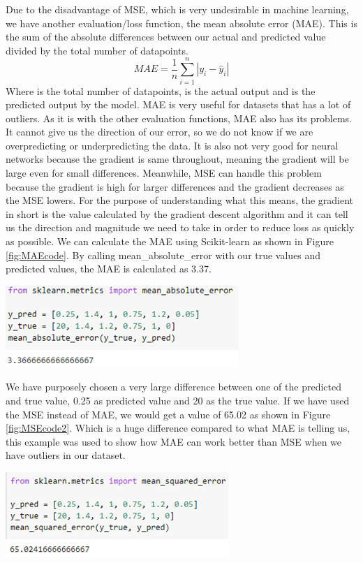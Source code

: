 \documentclass[a4paper,12pt]{report}
\begin{document}
Due to the disadvantage of MSE, which is very undesirable in machine learning, we have another evaluation/loss function, the mean absolute error (MAE). This is the sum of the absolute differences between our actual and predicted value divided by the total number of datapoints.
$$MAE=\frac{1}{n}\sum_{i=1}^n|y_i-\hat{y}_i|$$
Where  is the total number of datapoints,  is the actual output and  is the predicted output by the model. MAE is very useful for datasets that has a lot of outliers. As it is with the other evaluation functions, MAE also has its problems. It cannot give us the direction of our error, so we do not know if we are overpredicting or underpredicting the data. It is also not very good for neural networks because the gradient is same throughout, meaning the gradient will be large even for small differences. Meanwhile, MSE can handle this problem because the gradient is high for larger differences and the gradient decreases as the MSE lowers. For the purpose of understanding what this means, the gradient in short is the value calculated by the gradient descent algorithm and it can tell us the direction and magnitude we need to take in order to reduce loss as quickly as possible. We can calculate the MAE using Scikit-learn as shown in Figure \ref{fig:MAEcode}. By calling mean\_absolute\_error with our true values and predicted values, the MAE is calculated as 3.37.

\begin{center}
    \captionsetup{type=figure}
    \includegraphics[width=.6\linewidth]{media/MAEcode.png}
    \label{fig:MAEcode}
\end{center}

We have purposely chosen a very large difference between one of the predicted and true value, 0.25 as predicted value and 20 as the true value. If  we have used the MSE instead of MAE, we would get a value of 65.02 as shown in Figure \ref{fig:MSEcode2}. Which is a huge difference compared to what MAE is telling us, this example was used to show how MAE can work better than MSE when we have outliers in our dataset.

\begin{center}
    \captionsetup{type=figure}
    \includegraphics[width=.6\linewidth]{media/MSEcode2.png}
    \label{fig:MSEcode2}
\end{center}
 
\end{document}
